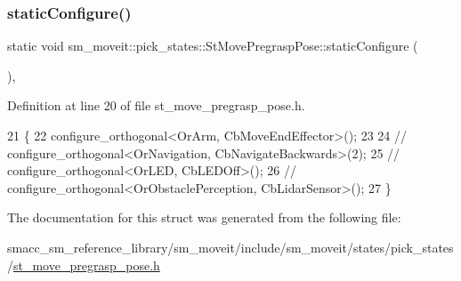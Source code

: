 \subsubsection{\texorpdfstring{static\+Configure()}{staticConfigure()}}
{\footnotesize\ttfamily static void sm\+\_\+moveit\+::pick\+\_\+states\+::\+St\+Move\+Pregrasp\+Pose\+::static\+Configure (\begin{DoxyParamCaption}{ }\end{DoxyParamCaption})\hspace{0.3cm}{\ttfamily [inline]}, {\ttfamily [static]}}



Definition at line 20 of file st\+\_\+move\+\_\+pregrasp\+\_\+pose.\+h.


\begin{DoxyCode}
21     \{
22         configure\_orthogonal<OrArm, CbMoveEndEffector>();
23 
24         \textcolor{comment}{//   configure\_orthogonal<OrNavigation, CbNavigateBackwards>(2);}
25         \textcolor{comment}{//   configure\_orthogonal<OrLED, CbLEDOff>();}
26         \textcolor{comment}{//   configure\_orthogonal<OrObstaclePerception, CbLidarSensor>();}
27     \}
\end{DoxyCode}


The documentation for this struct was generated from the following file\+:\begin{DoxyCompactItemize}
\item 
smacc\+\_\+sm\+\_\+reference\+\_\+library/sm\+\_\+moveit/include/sm\+\_\+moveit/states/pick\+\_\+states/\hyperlink{sm__moveit_2include_2sm__moveit_2states_2pick__states_2st__move__pregrasp__pose_8h}{st\+\_\+move\+\_\+pregrasp\+\_\+pose.\+h}\end{DoxyCompactItemize}
